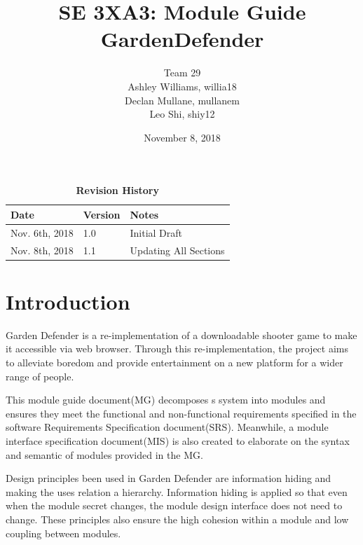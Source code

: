 \documentclass[12pt, titlepage]{article}
\title{SE 3XA3: Module Guide\\GardenDefender}
\author{Team 29
		\\ Ashley Williams, willia18
		\\ Declan Mullane, mullanem
		\\ Leo Shi, shiy12
}
\date{November 8, 2018}
\begin{document}
\maketitle

\tableofcontents
\listoftables
\listoffigures

\begin{table}[bp]
\caption{\bf Revision History}
\begin{tabularx}{\textwidth}{p{3cm}p{2cm}X}
\toprule {\bf Date} & {\bf Version} & {\bf Notes}\\
\midrule
Nov. 6th, 2018 & 1.0 & Initial Draft\\
Nov. 8th, 2018 & 1.1 & Updating All Sections\\
\bottomrule
\end{tabularx}
\end{table}

\newpage


\section{Introduction}\label{SecIntro}


Garden Defender is a re-implementation of a downloadable shooter game to make it accessible via web browser. Through this re-implementation, the project aims to alleviate boredom and provide entertainment on a new platform for a wider range of people.  

This module guide document(MG) decomposes s system into modules and ensures they meet the functional and non-functional requirements specified in the software Requirements Specification document(SRS). Meanwhile, a module interface specification document(MIS) is also created to elaborate on the syntax and semantic of modules provided in the MG.

Design principles been used in Garden Defender are information hiding and making the uses relation a hierarchy. Information hiding is applied so that even when the module secret changes, the module design interface does not need to change. These principles also ensure the high cohesion within a module and low coupling between modules. 
\end{document}
